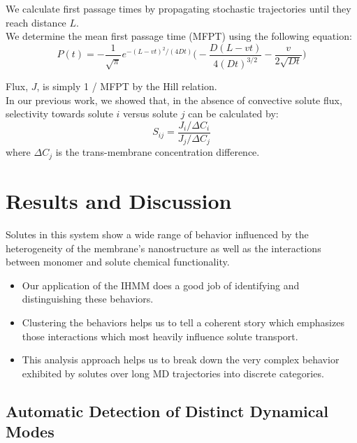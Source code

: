 \documentclass{article}
\begin{document}
  \noindent We calculate first passage times by propagating stochastic trajectories until they
  reach distance $L$. \\
  
  We determine the mean first passage time (MFPT) using the following equation:~\cite{cussler_diffusion:_2009}
  \begin{equation}
  P(t) = -\frac{1}{\sqrt{\pi}}e^{-(L - vt)^2 / (4Dt)}\bigg(-\frac{D(L - vt)}{4(Dt)^{3/2}} - \frac{v}{2\sqrt{Dt}}\bigg)
  \label{eqn:passage_times}
  \end{equation}
  
  \noindent Flux, $J$, is simply 1 / MFPT by the Hill relation.~\cite{hill_free_1989} \\
  
  In our previous work, we showed that, in the absence of convective solute flux, selectivity
  towards solute $i$ versus solute $j$ can be calculated by:  
  \begin{equation}
  S_{ij} = \frac{J_i / \Delta C_i}{J_j / \Delta C_j}
  \label{eqn:selectivity}
  \end{equation}
  where $\Delta C_j$ is the trans-membrane concentration difference.

  \section{Results and Discussion}
  
  Solutes in this system show a wide range of behavior influenced by the 
  heterogeneity of the membrane's nanostructure as well as the interactions 
  between monomer and solute chemical functionality. 
  \begin{itemize}  
  	\item Our application of the IHMM does a good job of identifying and
  	distinguishing these behaviors.   	
  	\item Clustering the behaviors helps us to tell a coherent story which
  	emphasizes those interactions which most heavily influence solute transport.
  	\item This analysis approach helps us to break down the very complex behavior
  	exhibited by solutes over long MD trajectories into discrete categories.
  \end{itemize}  	

  \subsection{Automatic Detection of Distinct Dynamical Modes}\label{section:find_modes}
  
\end{document}
